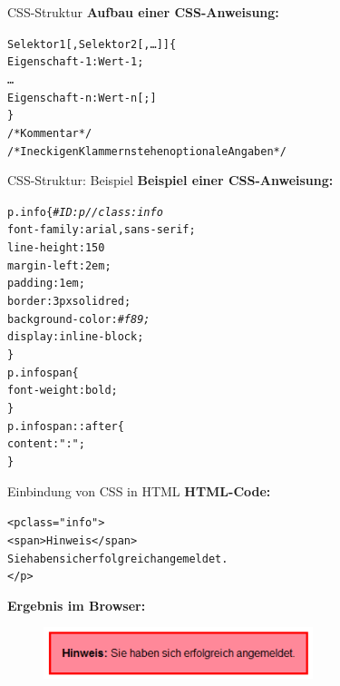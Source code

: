 \documentclass[xcolor=dvipsnames]{beamer}\usepackage[]{graphicx}\usepackage[]{color}
\makeatletter
\newcommand{\hlstr}[1]{\textcolor[rgb]{0.192,0.494,0.8}{#1}}%
\newcommand{\hlcom}[1]{\textcolor[rgb]{0.678,0.584,0.686}{\textit{#1}}}%
\newenvironment{kframe}{%
 \def\at@end@of@kframe{}%
 \ifinner\ifhmode%
  \def\at@end@of@kframe{\end{minipage}}%
  \begin{minipage}{\columnwidth}%
 \fi\fi%
 \def\FrameCommand##1{\hskip\@totalleftmargin \hskip-\fboxsep
 \colorbox{shadecolor}{##1}\hskip-\fboxsep
     \hskip-\linewidth \hskip-\@totalleftmargin \hskip\columnwidth}%
 \MakeFramed {\advance\hsize-\width
   \@totalleftmargin\z@ \linewidth\hsize
   \@setminipage}}%
 {\par\unskip\endMakeFramed%
 \at@end@of@kframe}
\makeatother
\begin{document}
\begin{frame}[fragile]{CSS-Struktur}
\textbf{Aufbau einer CSS-Anweisung:}
\begin{kframe}
\begin{alltt}
Selektor1 [, Selektor2 [, …] ] \{
    Eigenschaft-1: Wert-1;
    …
    Eigenschaft-n: Wert-n[;]
\}
/* Kommentar */
/* In eckigen Klammern stehen optionale Angaben */
\end{alltt}
\end{kframe}
\end{frame}


\begin{frame}[fragile]{CSS-Struktur: Beispiel}
\textbf{Beispiel einer CSS-Anweisung:}
\begin{kframe}
\begin{alltt}
p.info \{ \hlcom{#ID:p // class: info}
  font-family: arial, sans-serif;
  line-height: 150%
  margin-left: 2em;
  padding: 1em;
  border: 3px solid red;
  background-color: \hlcom{#f89;}
  display: inline-block;
\}
p.info span \{
  font-weight: bold;
\}
p.info span::after \{
  content: \hlstr{": "};
\}
\end{alltt}
\end{kframe}
\end{frame}


\begin{frame}[fragile]{Einbindung von CSS in HTML}
\textbf{HTML-Code:}
\begin{kframe}
\begin{alltt}
<p class=\hlstr{"info"}>
  <span>Hinweis</span>
  Sie haben sich erfolgreich angemeldet.
</p>
\end{alltt}
\end{kframe}
\textbf{Ergebnis im Browser:}  
  \begin{figure}
  	\centering
  	\includegraphics[width=0.7\textwidth]{figure/CSSinHTML.png}
  \end{figure}
\end{frame}
\end{document}
